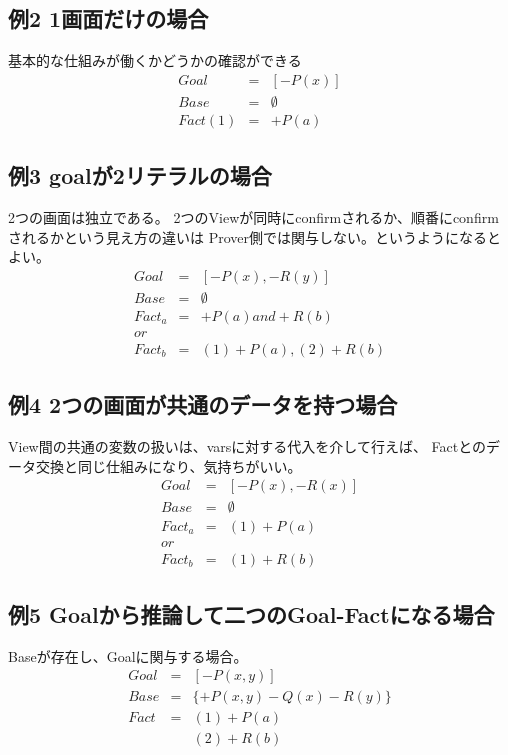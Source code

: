 \documentclass[10pt, onecolumn]{jarticle}   	%
\begin{document}
\subsection{例2 1画面だけの場合}
基本的な仕組みが働くかどうかの確認ができる
\begin{eqnarray*}
Goal &=& [-P(x)] \\
Base &=& \emptyset \\
Fact(1) &=&+P(a) 
\end{eqnarray*}
\subsection{例3 goalが2リテラルの場合}
2つの画面は独立である。
2つのViewが同時にconfirmされるか、順番にconfirmされるかという見え方の違いは
Prover側では関与しない。というようになるとよい。
\begin{eqnarray*}
Goal &=& [-P(x),-R(y)] \\
Base &=& \emptyset \\
Fact_a &=&+P(a) and +R(b) \\
or \\
Fact_b &=& (1) +P(a) , (2) +R(b)
\end{eqnarray*}

\subsection{例4 2つの画面が共通のデータを持つ場合}
View間の共通の変数の扱いは、varsに対する代入を介して行えば、
Factとのデータ交換と同じ仕組みになり、気持ちがいい。
\begin{eqnarray*}
Goal &=& [-P(x),-R(x)] \\
Base &=& \emptyset \\
Fact_a &=&(1) +P(a) \\
or \\
Fact_b &=& (1) +R(b)
\end{eqnarray*}

\subsection{例5 Goalから推論して二つのGoal-Factになる場合}
Baseが存在し、Goalに関与する場合。
\begin{eqnarray*}
Goal &=& [-P(x,y)] \\
Base &=& \{+P(x,y)-Q(x)-R(y)\} \\
Fact &=&(1) +P(a) \\
& & (2) +R(b)
\end{eqnarray*}
\end{document}
